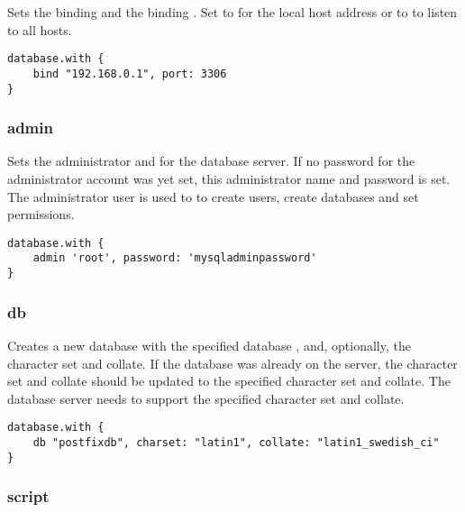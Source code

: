 Sets the binding  and the binding . Set to 
for the local host address  or to  to listen to all
hosts.

\begin{lstlisting}[style=Groovy]
database.with {
    bind "192.168.0.1", port: 3306
}
\end{lstlisting}

\subsubsection{admin}


Sets the administrator  and  for the database server. If no password for
the administrator account was yet set, this administrator name and password is set. The administrator 
user is used to to create users, create databases and set permissions.

\begin{lstlisting}[style=Groovy]
database.with {
    admin 'root', password: 'mysqladminpassword'
}
\end{lstlisting}

\subsubsection{db}


Creates a new database with the specified database , 
and, optionally, the character set and collate. If the database was already on 
the server, the character set and collate should be updated to the specified 
character set and collate. The database server needs to support 
the specified character set and collate.

\begin{lstlisting}[style=Groovy]
database.with {
    db "postfixdb", charset: "latin1", collate: "latin1_swedish_ci"
}
\end{lstlisting}

\subsubsection{script}

